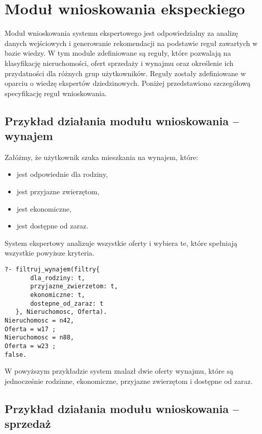 \section{Moduł wnioskowania ekspeckiego}

Moduł wnioskowania systemu ekspertowego jest odpowiedzialny za analizę danych wejściowych i generowanie rekomendacji na podstawie reguł zawartych w bazie wiedzy. W tym module zdefiniowane są reguły, które pozwalają na klasyfikację nieruchomości, ofert sprzedaży i wynajmu oraz określenie ich przydatności dla różnych grup użytkowników. Reguły zostały zdefiniowane w oparciu o wiedzę ekspertów dziedzinowych. Poniżej przedstawiono szczegółową specyfikację reguł wnioskowania.


\subsection{Przykład działania modułu wnioskowania – wynajem}

Załóżmy, że użytkownik szuka mieszkania na wynajem, które:
\begin{itemize}
    \item jest odpowiednie dla rodziny,
    \item jest przyjazne zwierzętom,
    \item jest ekonomiczne,
    \item jest dostępne od zaraz.
\end{itemize}
System ekspertowy analizuje wszystkie oferty i wybiera te, które spełniają wszystkie powyższe kryteria.

\begin{verbatim}
?- filtruj_wynajem(filtry{
       dla_rodziny: t,
       przyjazne_zwierzetom: t,
       ekonomiczne: t,
       dostepne_od_zaraz: t
   }, Nieruchomosc, Oferta).
Nieruchomosc = n42,
Oferta = w17 ;
Nieruchomosc = n88,
Oferta = w23 ;
false.
\end{verbatim}

W powyższym przykładzie system znalazł dwie oferty wynajmu, które są jednocześnie rodzinne, ekonomiczne, przyjazne zwierzętom i dostępne od zaraz.

\subsection{Przykład działania modułu wnioskowania – sprzedaż}

